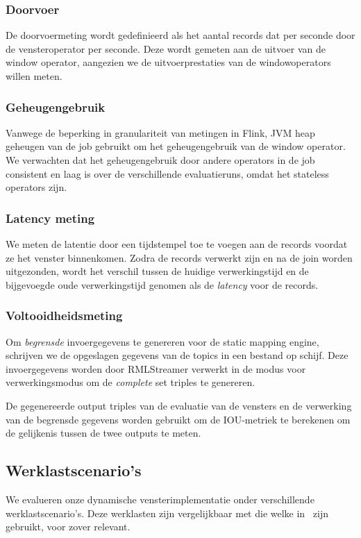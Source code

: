 \subsubsection{Doorvoer}%
\label{ssub:Throughput}
De doorvoermeting wordt gedefinieerd als het aantal records dat per seconde door de 
vensteroperator per seconde. 
Deze wordt gemeten aan de uitvoer van de window operator, aangezien we de 
uitvoerprestaties van de windowoperators willen meten. 


\subsubsection{Geheugengebruik}%
\label{ssub:Memory usage}
Vanwege de beperking in granulariteit van metingen in Flink, 
JVM heap geheugen van de job gebruikt om het geheugengebruik van de window 
operator. We verwachten dat het geheugengebruik door andere operators in de job 
consistent en laag is over de verschillende evaluatieruns, omdat het stateless operators zijn.

\subsubsection{Latency meting}%
\label{ssub:Latency measurement}
We meten de latentie door een tijdstempel toe te voegen aan de 
records voordat ze het venster binnenkomen. 
Zodra de records verwerkt zijn en na de join worden uitgezonden, wordt het verschil 
tussen de huidige verwerkingstijd en de bijgevoegde oude verwerkingstijd 
genomen als de \emph{latency} voor de records. 

\subsubsection{Voltooidheidsmeting}%
\label{ssub:Completeness measurement}
Om \emph{begrensde} invoergegevens te genereren voor 
de static mapping engine, schrijven we de opgeslagen gegevens van de topics 
in een bestand op schijf. Deze invoergegevens worden door RMLStreamer verwerkt in de modus voor 
verwerkingsmodus om de \emph{complete} set triples te genereren. 

De gegenereerde output triples van de evaluatie van de vensters en de verwerking van de begrensde gegevens worden 
gebruikt om de IOU-metriek te berekenen om de gelijkenis tussen de twee outputs te meten.    



\subsection{Werklastscenario's}
\label{sec:workload}
We evalueren onze dynamische vensterimplementatie onder verschillende werklastscenario's. 
Deze werklasten zijn vergelijkbaar met die welke in~\cite{evalution_of_spe} zijn gebruikt, voor zover relevant.

